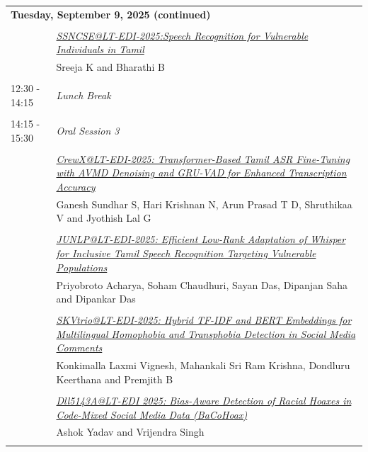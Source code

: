 \documentclass[11pt,oneside]{book}
\begin{document}
    \newpage
          \begin{tabular}{p{24mm}p{124mm}}
    \multicolumn{2}{l}{\bf Tuesday, September 9, 2025 (continued)} \\\\
          
                      & \hyperlink{page.6}{\emph{SSNCSE@LT-EDI-2025:Speech Recognition for Vulnerable Individuals in Tamil}}\\
        & Sreeja K\index{K} and Bharathi B\index{B}\\\\
                      12:30 - 14:15 & \emph{Lunch Break}\\\\
      
                      14:15 - 15:30 & \emph{Oral Session 3}\\\\
      
                
                      & \hyperlink{page.11}{\emph{CrewX@LT-EDI-2025: Transformer-Based Tamil ASR Fine-Tuning with AVMD Denoising and GRU-VAD for Enhanced Transcription Accuracy}}\\
        & Ganesh Sundhar S\index{S}, Hari Krishnan N\index{N}, Arun Prasad T D\index{D}, Shruthikaa V\index{V} and Jyothish Lal G\index{G}\\\\
                
                      & \hyperlink{page.17}{\emph{JUNLP@LT-EDI-2025: Efficient Low-Rank Adaptation of Whisper for Inclusive Tamil Speech Recognition Targeting Vulnerable Populations}}\\
        & Priyobroto Acharya\index{Acharya}, Soham Chaudhuri\index{Chaudhuri}, Sayan Das\index{Das}, Dipanjan Saha\index{Saha} and Dipankar Das\index{Das}\\\\
                
                      & \hyperlink{page.26}{\emph{SKVtrio@LT-EDI-2025: Hybrid TF-IDF and BERT Embeddings for  Multilingual Homophobia and Transphobia Detection in Social Media  Comments}}\\
        & Konkimalla Laxmi Vignesh\index{Vignesh}, Mahankali Sri Ram Krishna\index{Krishna}, Dondluru Keerthana\index{Keerthana} and Premjith B\index{B}\\\\
                
                      & \hyperlink{page.31}{\emph{Dll5143A@LT-EDI 2025: Bias-Aware Detection of Racial Hoaxes in Code-Mixed Social Media Data (BaCoHoax)}}\\
        & Ashok Yadav\index{Yadav} and Vrijendra Singh\index{Singh}\\\\
                

\end{tabular}
\end{document}
